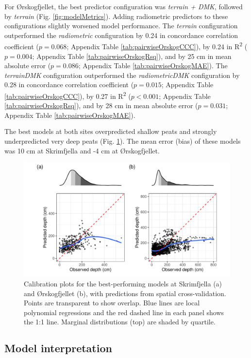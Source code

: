 \documentclass[soil, manuscript]{copernicus}
\begin{document}
For Ørskogfjellet, the best predictor configuration was \emph{terrain + DMK}, followed by \emph{terrain} (Fig. \ref{fig:modelMetrics}).
Adding radiometric predictors to these configurations slightly worsened model performance.
The \emph{terrain} configuration outperformed the \emph{radiometric} configuration by 0.24 in concordance correlation coefficient (\(p = 0.068\); Appendix Table \ref{tab:pairwiseOrskogCCC}), by 0.24 in R\textsuperscript{2} (\(p = 0.004\); Appendix Table \ref{tab:pairwiseOrskogRsq}), and by 25 cm in mean absolute error (\(p = 0.086\); Appendix Table \ref{tab:pairwiseOrskogMAE}).
The \emph{terrainDMK} configuration outperformed the \emph{radiometricDMK} configuration by 0.28 in concordance correlation coefficient (\(p = 0.015\); Appendix Table \ref{tab:pairwiseOrskogCCC}), by 0.27 in R\textsuperscript{2} (\(p < 0.001\); Appendix Table \ref{tab:pairwiseOrskogRsq}), and by 28 cm in mean absolute error (\(p = 0.031\); Appendix Table \ref{tab:pairwiseOrskogMAE}).

The best models at both sites overpredicted shallow peats and strongly underpredicted very deep peats (Fig. \ref{fig:calPlots}).
The mean error (bias) of these models was 10 cm at Skrimfjella and -4 cm at Ørskogfjellet.

\begin{figure}
\includegraphics[width=1\linewidth]{figures/calibration_plots} \caption{Calibration plots for the best-performing models at Skrimfjella (a) and Ørskogfjellet (b), with predictions from spatial cross-validation. Points are transparent to show overlap. Blue lines are local polynomial regressions and the red dashed line in each panel shows the 1:1 line. Marginal distributions (top) are shaded by quartile.}\label{fig:calPlots}
\end{figure}

\subsection{Model interpretation}
\end{document}
